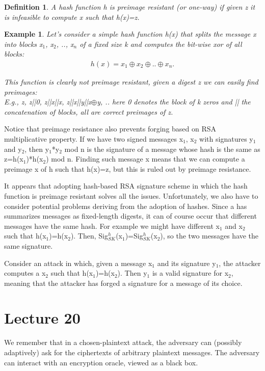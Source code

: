 \documentclass[a4paper, 12pt]{report}
\newtheorem{definition}{\textbf{Definition}}
\newtheorem{example}{\textbf{Example}}
\begin{document}
\begin{definition}
	A hash function h is preimage resistant (or one-way) if given z it is infeasible to compute x such that h(x)=z. 
\end{definition}  

\begin{example}\label{ex:hashxor}
	Let's consider a simple hash function h(x) that splits the message x into blocks x$_1$, x$_2$, .., x$_n$ of a fixed size k and computes the bit-wise xor of all blocks:
	\begin{align*}
	h(x)=x_1 \oplus x_2 \oplus .. \oplus x_n.
	\end{align*}
	
	This function is clearly not preimage resistant, given a digest z we can easily find preimages:\\
	E.g., z, z||0, z||x||x, z||x||y||x$\oplus$y, .. here 0 denotes the block of k zeros and || the concatenation of blocks, all are correct preimages of z.
\end{example}

Notice that preimage resistance also prevents forging based on RSA multiplicative property. If we have two signed messages x$_1$, x$_2$ with signatures y$_1$ and y$_2$, then y$_1$*y$_2$ mod n is the signature of a message whose hash is the same as z=h(x$_1$)*h(x$_2$) mod n. Finding such message x means that we can compute a preimage x of h such that h(x)=z, but this is ruled out by preimage resistance.

It appears that adopting hash-based RSA signature scheme in which the hash function is preimage resistant solves all the issues. Unfortunately, we also have to consider potential problems deriving from the adoption of hashes. Since a has summarizes messages as fixed-length digests, it can of course occur that different messages have the same hash. For example we might have different x$_1$ and x$_2$ such that h(x$_1$)=h(x$_2$). Then, Sig$^h_{SK}$(x$_1$)=Sig$^h_{SK}$(x$_2$), so the two messages have the same signature.

Consider an attack in which, given a message x$_1$ and its signature y$_1$, the attacker computes a x$_2$ such that h(x$_1$)=h(x$_2$). Then y$_1$ is a valid signature for x$_2$, meaning that the attacker has forged a signature for a message of its choice.

\chapter*{Lecture 20}
We remember that in a chosen-plaintext attack, the adversary can (possibly adaptively) ask for the ciphertexts of arbitrary plaintext messages. The adversary can interact with an encryption oracle, viewed as a black box.
\end{document}
